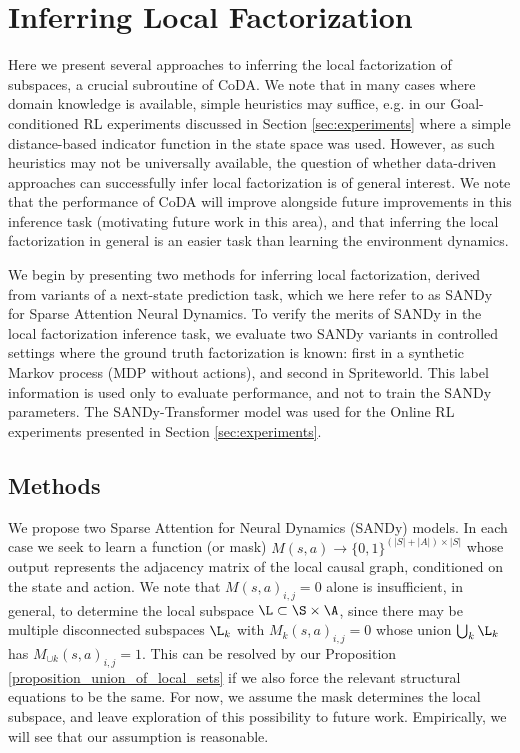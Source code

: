 \documentclass[coda.tex]{subfiles}
\begin{document}
\section{Inferring Local Factorization}\label{sec:inferring_local_factorization}
Here we present several approaches to inferring the local factorization of subspaces, a crucial subroutine of CoDA.
We note that in many cases where domain knowledge is available, simple heuristics may suffice, e.g. in our Goal-conditioned RL experiments discussed in Section \ref{sec:experiments} where a simple distance-based indicator function in the state space was used. 
However, as such heuristics may not be universally available, the question of whether data-driven approaches can successfully infer local factorization is of general interest.
We note that the performance of CoDA will improve alongside future improvements in this inference task (motivating future work in this area), and that inferring the local factorization in general is an easier task than learning the environment dynamics.

We begin by presenting two methods for inferring local factorization, derived from variants of a next-state prediction task, which we here refer to as SANDy for Sparse Attention Neural Dynamics.
To verify the merits of SANDy in the local factorization inference task, we evaluate two SANDy variants in controlled settings where the ground truth factorization is known: first in a synthetic Markov process (MDP without actions), and second in Spriteworld.
This label information is used only to evaluate performance, and not to train the SANDy parameters.
The SANDy-Transformer model was used for the Online RL experiments presented in Section \ref{sec:experiments}.

\subsection{Methods}\label{subsection_learning_factorization}

We propose two Sparse Attention for Neural Dynamics (SANDy) models. In each case we seek to learn a function (or mask) $M(s, a) \to \{0, 1\}^{(|S|+|A|)\times|S|}$ whose output represents the adjacency matrix of the local causal graph, conditioned on the state and action. We note that $M(s, a)_{i,j} = 0$ alone is insufficient, in general, to determine the local subspace $\L \subset \S \times \A$, since there may be multiple disconnected subspaces $\L_k$ with $M_k(s, a)_{i,j} = 0$ whose union $\bigcup_k \L_k$ has $M_{\cup k}(s, a)_{i,j} = 1$. This can be resolved by our Proposition \ref{proposition_union_of_local_sets} if we also force the relevant structural equations to be the same. For now, we assume the mask determines the local subspace, and leave exploration of this possibility to future work. Empirically, we will see that our assumption is reasonable.
\end{document}
